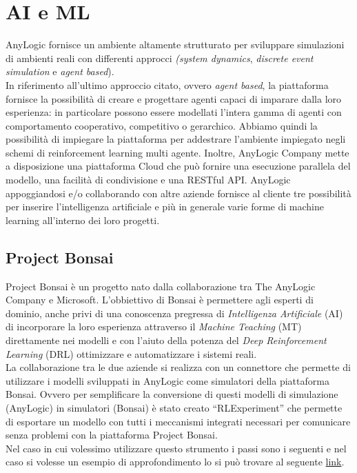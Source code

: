 \clearpage
\section{AI e ML}

AnyLogic fornisce un ambiente altamente strutturato per sviluppare simulazioni di ambienti reali con differenti approcci \textit{(system dynamics},  \textit{discrete event simulation} e\textit{ agent based}). 
\\ In riferimento all'ultimo approccio citato, ovvero \textit{agent based}, la piattaforma fornisce la possibilità di creare e progettare agenti capaci di imparare dalla loro esperienza: in particolare possono essere modellati l'intera gamma di agenti con comportamento cooperativo, competitivo o gerarchico. 
Abbiamo quindi la possibilità di impiegare la piattaforma per addestrare l'ambiente impiegato negli schemi di reinforcement learning multi agente.
Inoltre, AnyLogic Company mette a disposizione una piattaforma Cloud che può fornire una esecuzione parallela del modello, una facilità di condivisione e una RESTful API. 
AnyLogic appoggiandosi e/o collaborando con altre aziende fornisce al cliente tre possibilità per inserire l'intelligenza artificiale e più in generale varie forme di machine learning all'interno dei loro progetti.


\subsection{Project Bonsai}

Project Bonsai è un progetto nato dalla collaborazione tra The AnyLogic Company e Microsoft. L'obbiettivo di Bonsai è permettere agli esperti di dominio, anche privi di una conoscenza pregressa di \textit{Intelligenza Artificiale} (AI) di incorporare la loro esperienza attraverso il \textit{Machine Teaching} (MT) direttamente nei modelli e con l'aiuto della potenza del\textit{ Deep Reinforcement Learning }(DRL) ottimizzare e automatizzare i sistemi reali.\\
La collaborazione tra le due aziende si realizza con un connettore che permette di utilizzare i modelli sviluppati in AnyLogic come simulatori della piattaforma Bonsai. Ovvero per semplificare la conversione di questi modelli di simulazione (AnyLogic) in simulatori (Bonsai) è stato creato “RLExperiment” che permette di  esportare un modello con tutti i meccanismi integrati necessari per comunicare senza problemi con la piattaforma Project Bonsai.
\\ Nel caso in cui volessimo utilizzare questo strumento i passi sono i seguenti e nel caso si volesse un esempio di approfondimento lo si può trovare al seguente \href{https://microsoft.github.io/moab/tutorials/1-balance/index.html}{link}.

